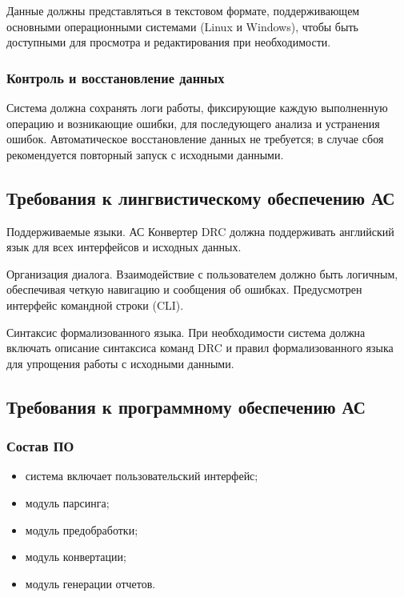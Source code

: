 Данные должны представляться в текстовом формате,
поддерживающем основными операционными системами (Linux и Windows),
чтобы быть доступными для просмотра и редактирования при необходимости.

\subsubsection{Контроль и восстановление данных}

Система должна сохранять логи работы, фиксирующие каждую выполненную операцию
и возникающие ошибки, для последующего анализа и устранения ошибок.
Автоматическое восстановление данных не требуется;
в случае сбоя рекомендуется повторный запуск с исходными данными.

\subsection{Требования к лингвистическому обеспечению АС}

Поддерживаемые языки.
АС Конвертер DRC должна поддерживать английский язык
для всех интерфейсов и исходных данных.

Организация диалога.
Взаимодействие с пользователем должно быть логичным,
обеспечивая четкую навигацию и сообщения об ошибках.
Предусмотрен интерфейс командной строки (CLI).

Синтаксис формализованного языка.
При необходимости система должна включать описание синтаксиса команд DRC
и правил формализованного языка для упрощения работы с исходными данными.

\subsection{Требования к программному обеспечению АС}

\subsubsection{Состав ПО}

\begin{itemize}
	\item система включает пользовательский интерфейс;
	\item модуль парсинга;
	\item модуль предобработки;
	\item модуль конвертации;
	\item модуль генерации отчетов.
\end{itemize}

